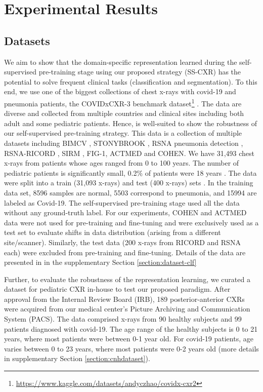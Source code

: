 \documentclass[10pt,journal,compsoc]{IEEEtran}
\begin{document}
\section{Experimental Results}
\subsection{Datasets}
We aim to show that the domain-specific representation learned during the self-supervised pre-training stage using our proposed strategy (SS-CXR) has the potential to solve frequent clinical tasks (classification and segmentation). To this end, we use one of the biggest collections of chest x-rays with covid-19 and pneumonia patients, the COVIDxCXR-3 benchmark dataset\footnote{\url{https://www.kaggle.com/datasets/andyczhao/covidx-cxr2}} \cite{Covidnet, pavlova2022covidx}. The data are diverse and collected from multiple countries and clinical sites including both adult and some pediatric patients. Hence, is well-suited to show the robustness of our self-supervised pre-training strategy.   
This data is a collection of multiple datasets including BIMCV \cite{bimcv}, STONYBROOK \cite{stony}, RSNA pneumonia detection \cite{rsna}, RSNA-RICORD \cite{ricord}, SIRM \cite{SIRM}, FIG-1\cite{fig1}, ACTMED \cite{actmed} and COHEN\cite{cohen}. We have 31,493 chest x-rays from patients whose ages ranged from 0 to 100 years. The number of pediatric patients is significantly small, 0.2\% of patients were  18 years \cite{pavlova2022covidx}. The data were split into a train (31,093 x-rays) and test (400 x-rays) sets . In the training data set, 8596 samples are normal, 5503 correspond to pneumonia, and 15994 are labeled as Covid-19. The self-supervised pre-training stage used all the data without any ground-truth label.  For our experiments, COHEN and ACTMED data were not used for pre-training and fine-tuning and were exclusively used as a test set to evaluate shifts in data distribution (arising from a different site/scanner). Similarly, the test data (200 x-rays from RICORD and RSNA each) were excluded from pre-training and fine-tuning. Details of the data are presented in in the supplementary Section \ref{section:dataset-clf} 

Further, to evaluate the robustness of the representation learning, we curated a dataset for pediatric CXR in-house to test our proposed paradigm. After approval from the Internal Review Board (IRB), 189 posterior-anterior CXRs were acquired from our medical center's Picture Archiving and Communication System (PACS). The data comprised x-rays from 90 healthy subjects and 99 patients diagnosed with covid-19. The age range of the healthy subjects is 0 to 21 years, where most patients were between 0-1 year old. For covid-19 patients, age varies between 0 to 23 years, where most patients were 0-2 years old (more details in supplementary Section \ref{section:cnhdataset}).
\end{document}
